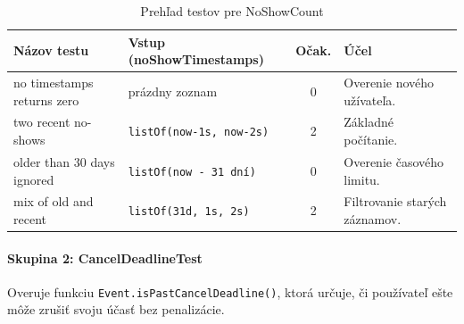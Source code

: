   \begin{table}[H]
      \centering                                                                                                                                                                                                                   
      \caption{Prehľad testov pre NoShowCount}
      \begin{tabular}{|p{4.5cm}|p{4cm}|c|p{3.5cm}|}
          \hline                                                                                                                                                                                                                   
          \textbf{Názov testu} & \textbf{Vstup (noShowTimestamps)} & \textbf{Očak.} & \textbf{Účel} \\ \hline                                                                                                                      
          no timestamps returns zero & prázdny zoznam & 0 & Overenie nového užívateľa. \\ \hline                                                                                                                                   
          two recent no-shows & \texttt{listOf(now-1s, now-2s)} & 2 & Základné počítanie. \\ \hline                                                                                                                                
          older than 30 days ignored & \texttt{listOf(now - 31 dní)} & 0 & Overenie časového limitu. \\ \hline                                                                                                                     
          mix of old and recent & \texttt{listOf(31d, 1s, 2s)} & 2 & Filtrovanie starých záznamov. \\ \hline                                                                                                                       
      \end{tabular}
  \end{table}

  \paragraph{Skupina 2: CancelDeadlineTest}
  Overuje funkciu \texttt{Event.isPastCancelDeadline()}, ktorá určuje, či používateľ ešte môže zrušiť svoju účasť bez penalizácie.

